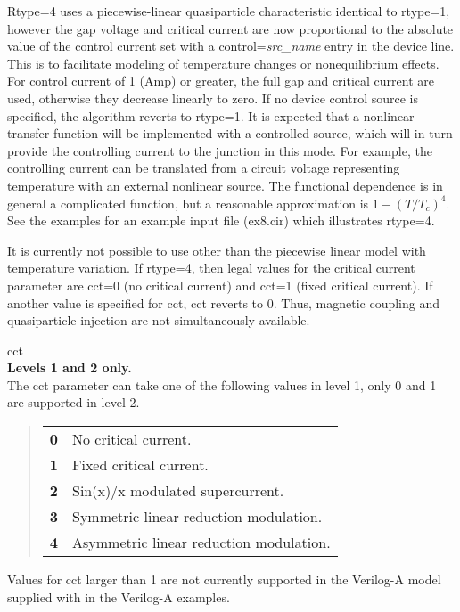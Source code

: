 \begin{description}
{\vt Rtype=4} uses a piecewise-linear quasiparticle characteristic
identical to {\vt rtype=1}, however the gap voltage and critical
current are now proportional to the absolute value of the control
current set with a {\vt control=}{\it src\_name} entry in the device
line.  This is to facilitate modeling of temperature changes or
nonequilibrium effects.  For control current of 1 (Amp) or greater,
the full gap and critical current are used, otherwise they decrease
linearly to zero.  If no device control source is specified, the
algorithm reverts to {\vt rtype=1}.  It is expected that a nonlinear
transfer function will be implemented with a controlled source, which
will in turn provide the controlling current to the junction in this
mode.  For example, the controlling current can be translated from a
circuit voltage representing temperature with an external nonlinear
source.  The functional dependence is in general a complicated
function, but a reasonable approximation is $1 - (T/T_c)^4$.  See the
examples for an example input file ({\vt ex8.cir}) which illustrates
{\vt rtype=4}.

It is currently not possible to use other than the piecewise linear
model with temperature variation.  If {\vt rtype=4}, then legal values
for the critical current parameter are {\vt cct=0} (no critical
current) and {\vt cct=1} (fixed critical current).  If another value
is specified for {\vt cct}, {\vt cct} reverts to 0.  Thus, magnetic
coupling and quasiparticle injection are not simultaneously available.

\item{\vt cct}\\
{\bf Levels 1 and 2 only.}\\
The {\vt cct} parameter can take one of the following values in level
1, only 0 and 1 are supported in level 2.
\begin{quote}
\begin{tabular}{ll}
\bf 0 & No critical current.\\
\bf 1 & Fixed critical current.\\
\bf 2 & Sin(x)/x modulated supercurrent.\\
\bf 3 & Symmetric linear reduction modulation.\\
\bf 4 & Asymmetric linear reduction modulation.\\
\end{tabular}
\end{quote}

Values for {\vt cct} larger than 1 are not currently supported in the
Verilog-A model supplied with {\WRspice} in the Verilog-A examples.


\end{description}
